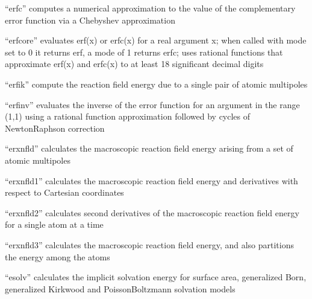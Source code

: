 \documentclass[letterpaper,11pt,english]{sphinxmanual}
\begin{document}
\sphinxAtStartPar
{}

\sphinxAtStartPar
“erfc” computes a numerical approximation to the value of the complementary error function via a Chebyshev approximation

\sphinxAtStartPar
{}

\sphinxAtStartPar
“erfcore” evaluates erf(x) or erfc(x) for a real argument x; when called with mode set to 0 it returns erf, a mode of 1 returns erfc; uses rational functions that approximate erf(x) and erfc(x) to at least 18 significant decimal digits

\sphinxAtStartPar
{}

\sphinxAtStartPar
“erfik” compute the reaction field energy due to a single pair of atomic multipoles

\sphinxAtStartPar
{}

\sphinxAtStartPar
“erfinv” evaluates the inverse of the error function for an argument in the range (\sphinxhyphen{}1,1) using a rational function approximation followed by cycles of Newton\sphinxhyphen{}Raphson correction

\sphinxAtStartPar
{}

\sphinxAtStartPar
“erxnfld” calculates the macroscopic reaction field energy arising from a set of atomic multipoles

\sphinxAtStartPar
{}

\sphinxAtStartPar
“erxnfld1” calculates the macroscopic reaction field energy and derivatives with respect to Cartesian coordinates

\sphinxAtStartPar
{}

\sphinxAtStartPar
“erxnfld2” calculates second derivatives of the macroscopic reaction field energy for a single atom at a time

\sphinxAtStartPar
{}

\sphinxAtStartPar
“erxnfld3” calculates the macroscopic reaction field energy, and also partitions the energy among the atoms

\sphinxAtStartPar
{}

\sphinxAtStartPar
“esolv” calculates the implicit solvation energy for surface area, generalized Born, generalized Kirkwood and Poisson\sphinxhyphen{}Boltzmann solvation models
\end{document}
